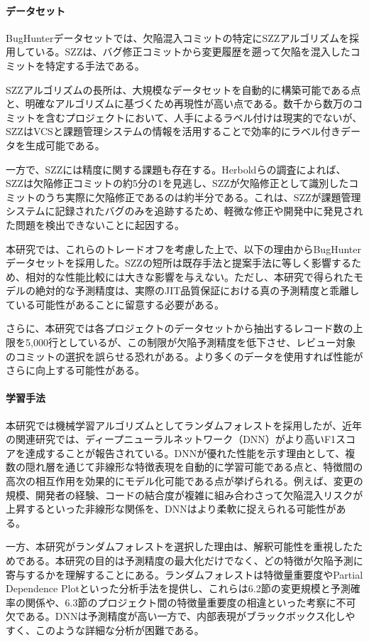 \paragraph{データセット}
BugHunterデータセットでは、欠陥混入コミットの特定にSZZアルゴリズムを採用している。SZZは、バグ修正コミットから変更履歴を遡って欠陥を混入したコミットを特定する手法である。

SZZアルゴリズムの長所は、大規模なデータセットを自動的に構築可能である点と、明確なアルゴリズムに基づくため再現性が高い点である。数千から数万のコミットを含むプロジェクトにおいて、人手によるラベル付けは現実的でないが、SZZはVCSと課題管理システムの情報を活用することで効率的にラベル付きデータを生成可能である。

一方で、SZZには精度に関する課題も存在する。Herboldらの調査によれば、SZZは欠陥修正コミットの約5分の1を見逃し、SZZが欠陥修正として識別したコミットのうち実際に欠陥修正であるのは約半分である\cite{herbold2022}。これは、SZZが課題管理システムに記録されたバグのみを追跡するため、軽微な修正や開発中に発見された問題を検出できないことに起因する。

本研究では、これらのトレードオフを考慮した上で、以下の理由からBugHunterデータセットを採用した。SZZの短所は既存手法と提案手法に等しく影響するため、相対的な性能比較には大きな影響を与えない。ただし、本研究で得られたモデルの絶対的な予測精度は、実際のJIT品質保証における真の予測精度と乖離している可能性があることに留意する必要がある。

さらに、本研究では各プロジェクトのデータセットから抽出するレコード数の上限を5,000行としているが、この制限が欠陥予測精度を低下させ、レビュー対象のコミットの選択を誤らせる恐れがある。より多くのデータを使用すれば性能がさらに向上する可能性がある。

\paragraph{学習手法}
本研究では機械学習アルゴリズムとしてランダムフォレストを採用したが、近年の関連研究では、ディープニューラルネットワーク（DNN）がより高いF1スコアを達成することが報告されている。DNNが優れた性能を示す理由として、複数の隠れ層を通じて非線形な特徴表現を自動的に学習可能である点と、特徴間の高次の相互作用を効果的にモデル化可能である点が挙げられる。例えば、変更の規模、開発者の経験、コードの結合度が複雑に組み合わさって欠陥混入リスクが上昇するといった非線形な関係を、DNNはより柔軟に捉えられる可能性がある。

一方、本研究がランダムフォレストを選択した理由は、解釈可能性を重視したためである。本研究の目的は予測精度の最大化だけでなく、どの特徴が欠陥予測に寄与するかを理解することにある。ランダムフォレストは特徴量重要度やPartial Dependence Plotといった分析手法を提供し、これらは6.2節の変更規模と予測確率の関係や、6.3節のプロジェクト間の特徴量重要度の相違といった考察に不可欠である。DNNは予測精度が高い一方で、内部表現がブラックボックス化しやすく、このような詳細な分析が困難である。

